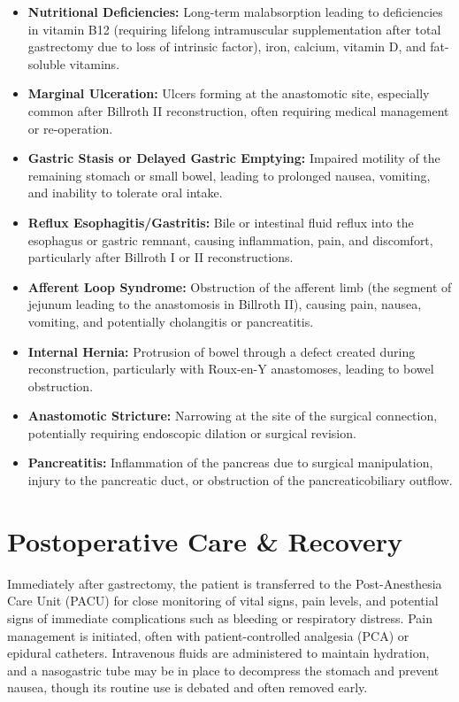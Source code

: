\begin{itemize}
\begin{itemize}
      \item \textbf{Nutritional Deficiencies:} Long-term malabsorption leading to deficiencies in vitamin B12 (requiring lifelong intramuscular supplementation after total gastrectomy due to loss of intrinsic factor), iron, calcium, vitamin D, and fat-soluble vitamins.
      \item \textbf{Marginal Ulceration:} Ulcers forming at the anastomotic site, especially common after Billroth II reconstruction, often requiring medical management or re-operation.
      \item \textbf{Gastric Stasis or Delayed Gastric Emptying:} Impaired motility of the remaining stomach or small bowel, leading to prolonged nausea, vomiting, and inability to tolerate oral intake.
      \item \textbf{Reflux Esophagitis/Gastritis:} Bile or intestinal fluid reflux into the esophagus or gastric remnant, causing inflammation, pain, and discomfort, particularly after Billroth I or II reconstructions.
      \item \textbf{Afferent Loop Syndrome:} Obstruction of the afferent limb (the segment of jejunum leading to the anastomosis in Billroth II), causing pain, nausea, vomiting, and potentially cholangitis or pancreatitis.
      \item \textbf{Internal Hernia:} Protrusion of bowel through a defect created during reconstruction, particularly with Roux-en-Y anastomoses, leading to bowel obstruction.
      \item \textbf{Anastomotic Stricture:} Narrowing at the site of the surgical connection, potentially requiring endoscopic dilation or surgical revision.
      \item \textbf{Pancreatitis:} Inflammation of the pancreas due to surgical manipulation, injury to the pancreatic duct, or obstruction of the pancreaticobiliary outflow.
    \end{itemize}
\end{itemize}

\section*{Postoperative Care \& Recovery}
Immediately after gastrectomy, the patient is transferred to the Post-Anesthesia Care Unit (PACU) for close monitoring of vital signs, pain levels, and potential signs of immediate complications such as bleeding or respiratory distress. Pain management is initiated, often with patient-controlled analgesia (PCA) or epidural catheters. Intravenous fluids are administered to maintain hydration, and a nasogastric tube may be in place to decompress the stomach and prevent nausea, though its routine use is debated and often removed early.

